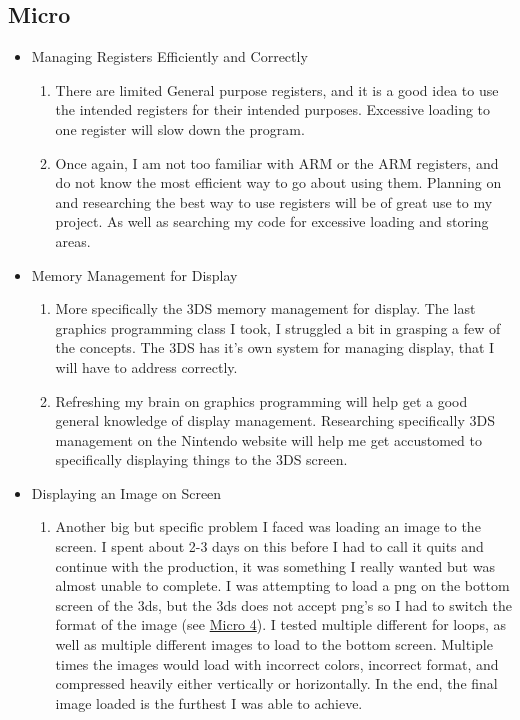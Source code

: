 \documentclass{article}
\begin{document}
\subsection{Micro}
\begin{itemize}
\item Managing Registers Efficiently and Correctly
    \begin{enumerate}
    \item There are limited General purpose registers, and it is a good idea to use the intended registers for their intended purposes. Excessive loading to one register will slow down the program.
    \item Once again, I am not too familiar with ARM or the ARM registers, and do not know the most efficient way to go about using them. Planning on and researching the best way to use registers will be of great use to my project. As well as searching my code for excessive loading and storing areas.  
    \end{enumerate}
\item Memory Management for Display
    \begin{enumerate}
    \item More specifically the 3DS memory management for display. The last graphics programming class I took, I struggled a bit in grasping a few of the concepts. The 3DS has it's own system for managing display, that I will have to address correctly. 
    \item Refreshing my brain on graphics programming will help get a good general knowledge of display management. Researching specifically 3DS management on the Nintendo website will help me get accustomed to specifically displaying things to the 3DS screen. 
    \end{enumerate}
\item Displaying an Image on Screen
    \begin{enumerate}
        \item Another big but specific problem I faced was loading an image to the screen. I spent about 2-3 days on this before I had to call it quits and continue with the production, it was something I really wanted but was almost unable to complete. I was attempting to load a png on the bottom screen of the 3ds, but the 3ds does not accept png's so I had to switch the format of the image (see \hyperref[micro4]{Micro 4}). I tested multiple different for loops, as well as multiple different images to load to the bottom screen. Multiple times the images would load with incorrect colors, incorrect format, and compressed heavily either vertically or horizontally. In the end, the final image loaded is the furthest I was able to achieve. 

\end{enumerate}
\end{itemize}
\end{document}
